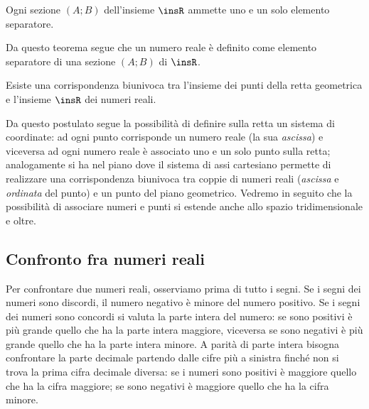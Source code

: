 \begin{teorema}[di Dedekind]
Ogni sezione $(A;B)$ dell'insieme $\insR$ ammette uno e un solo elemento separatore.
\end{teorema}

Da questo teorema segue che un numero reale è definito come elemento separatore di una sezione $(A;B)$ di $\insR$.

\begin{postulato}
Esiste una corrispondenza biunivoca tra l'insieme dei punti della retta geometrica e l'insieme $\insR$ dei numeri reali.
\end{postulato}

Da questo postulato segue la possibilità di definire sulla retta un sistema di coordinate: ad ogni punto corrisponde un numero reale (la sua \emph{ascissa}) e viceversa ad ogni numero reale è associato uno e un solo punto sulla retta; analogamente si ha nel piano dove il sistema di assi cartesiano permette di realizzare una corrispondenza biunivoca tra coppie di numeri reali (\emph{ascissa} e \emph{ordinata} del punto) e un punto del piano geometrico. Vedremo in seguito che la possibilità di associare numeri e punti si estende anche allo spazio tridimensionale e oltre.

\subsection{Confronto fra numeri reali}

Per confrontare due numeri reali, osserviamo prima di tutto i segni. Se i segni dei numeri sono
discordi, il numero negativo è minore del numero positivo. Se i segni dei numeri sono concordi si valuta la parte intera del numero: se sono positivi è più grande quello che ha la parte intera maggiore, viceversa se sono negativi è più grande quello che ha la parte intera minore. A parità di parte intera bisogna confrontare la parte decimale partendo dalle cifre più a sinistra finché non si trova la prima cifra decimale diversa: se i numeri sono positivi è maggiore quello che ha la cifra maggiore; se sono negativi è maggiore quello che ha la cifra minore.

